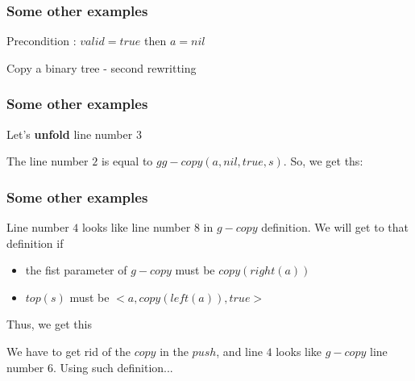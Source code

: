 \documentclass{beamer}
\begin{document}
\begin{frame}
	\frametitle{Some other examples}
	Precondition : $valid = true$ then $a = nil$
	\begin{block}{Copy a binary tree - second rewritting}
		\begin{algorithmic}[1]
					\State {}
				\Else
					\State {}
				\EndIf
			\EndProcedure
		\end{algorithmic}
	\end{block}
\end{frame}
\begin{frame}
	\frametitle{Some other examples}
	Let's \textbf{unfold} line number $3$
	\begin{algorithmic}[1]
			\State{}
		\Else
			\State{}
		\EndIf
	\end{algorithmic}
	The line number $2$ is equal to $gg-copy(a,nil, true, s)$. So, we get ths:
	\begin{algorithmic}[1]
			\State{}
		\Else
			\State{}
		\EndIf
	\end{algorithmic}
	
\end{frame}
\begin{frame}
	\frametitle{Some other examples}
	Line number $4$ looks like line number $8$ in $g-copy$ definition. We will get to that definition if
	\begin{itemize}
		\item the fist parameter of $g-copy$ must be $copy(right(a))$
		\item $top(s)$ must be $<a, copy(left(a)),true>$
	\end{itemize}
	Thus, we get this
	\begin{algorithmic}[1]
		\small
			\State{}
		\Else
			\State{}
		\EndIf
	\end{algorithmic}
	We have to get rid of the $copy$ in the $push$, and line $4$ looks like $g-copy$ line number $6$. Using such definition... 
\end{frame}
\end{document}
